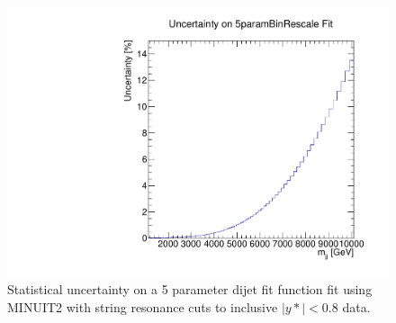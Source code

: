 
\begin{figure}
    \centering
    \includegraphics[width=1\linewidth]{figures/app-GlobalFitStudies/5ParamGlobalFit_ystar0p8_Uncertainty.pdf}
    \caption{Statistical uncertainty on a 5 parameter dijet fit function fit using MINUIT2 with string resonance cuts to inclusive $|y*|<0.8$ data.}
    \label{fig:BinningShapeAdjustment}
\end{figure}

